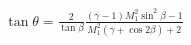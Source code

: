\documentclass[10pt]{article}
\begin{document}
\begin{align*}\tan \theta 
=
\frac{2}{ \tan \beta}
\frac{
\left(\gamma-1\right) M_{1}^{2} \sin^2 \beta - 1
}
{
M_{1}^{2} \left( \gamma + \cos 2 \beta \right) + 2
}\end{align*}
\end{document}
